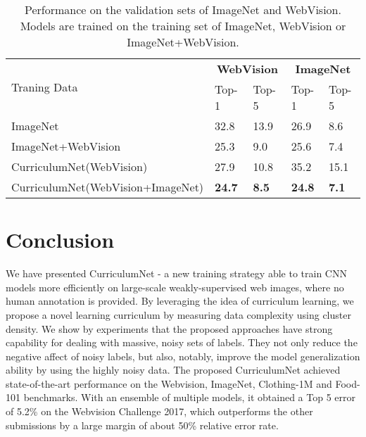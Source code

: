 \documentclass[runningheads]{llncs}
\begin{document}
\begin{table}[tp]
\begin{center}
\caption{Performance on the validation sets of ImageNet and WebVision. Models are trained on the training set of ImageNet, WebVision or ImageNet+WebVision. }
\label{tbl:webvision_imagenet}
\vspace{-2mm}
\begin{tabular}{p{6cm}|p{1.5cm}<{\centering}|p{1.2cm}<{\centering}|p{1.2cm}<{\centering}|p{1.2cm}<{\centering}}
  \hline
\multirow{2}{*}{Traning Data}& \multicolumn{2}{c}{\textbf{ WebVision}}&  \multicolumn{2}{c}{\textbf{ImageNet}} \\  \cline{2-5}
&Top-1&Top-5&Top-1&Top-5 \\
\hline
 ImageNet&32.8&13.9 & 26.9&8.6 \\
 \hline
 ImageNet+WebVision& 25.3&9.0& 25.6&7.4 \\
 \hline
\hline
CurriculumNet(WebVision)& 27.9 & 10.8 & 35.2 & 15.1 \\
CurriculumNet(WebVision+ImageNet) & {\bf24.7} &{\bf 8.5} & {\bf24.8}&{\bf 7.1} \\
\hline
\end{tabular}
\end{center}
\end{table}




\section{Conclusion}
We have presented  CurriculumNet - a new training strategy able to
train CNN models more efficiently on large-scale weakly-supervised web images, where no human annotation is provided.
By leveraging the idea of curriculum learning, we propose a novel learning curriculum by measuring data complexity using cluster density. We show by experiments that the proposed approaches have strong capability for dealing with massive, noisy sets of labels. They not only reduce the negative affect of noisy labels, but also, notably, improve the model generalization ability by using the highly noisy data. The proposed CurriculumNet achieved state-of-the-art performance on the Webvision, ImageNet, Clothing-1M and Food-101 benchmarks. With an ensemble of multiple models, it obtained a Top 5 error of 5.2\% on the Webvision Challenge 2017, which outperforms the other submissions by a large margin of about 50\% relative error rate.

	
\clearpage


	
\end{document}
